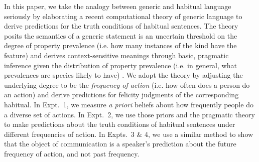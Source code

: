 \documentclass[10pt,letterpaper]{article}
\newcommand{\ndg}[1]{\textcolor{Green}{[ndg: #1]}}
\begin{document}
%

In this paper, we take the analogy between generic and habitual language seriously by elaborating a recent computational theory of generic language to derive predictions for the truth conditions of habitual sentences. 
The theory posits the semantics of a generic statement is an uncertain threshold on the degree of property prevalence (i.e. how many instances of the kind have the feature) and derives context-sensitive meanings through basic, pragmatic inference given the distribution of property prevalence (i.e. in general, what prevalences are species likely to have) \cite{TesslerUnderReview}.
We adopt the theory by adjusting the underlying degree to be the \emph{frequency of action} (i.e. how often does a person do an action) and derive predictions for felicity judgments of the corresponding habitual.
In Expt.~1, we measure \emph{a priori} beliefs about how frequently people do a diverse set of actions.
In Expt.~2, we use those priors and the pragmatic theory to make predictions about the truth conditions of habitual sentences under different frequencies of action. 
In Expts.~3 \& 4, we use a similar method to show that the object of communication is a speaker's prediction about the future frequency of action, and not past frequency.

\end{document}
